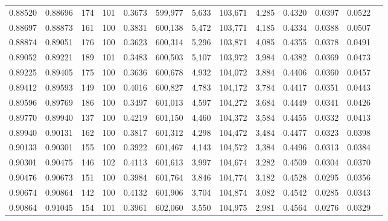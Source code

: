 \begin{tabular}{rrrrrrrrrrrrr}
0.88520 & 0.88696 &   174 & 101 &                                     0.3673 & 599,977 &   5,633 & 103,671 &   4,285 & 0.4320 & 0.0397 & 0.0522 \\
0.88697 & 0.88873 &   161 & 100 &                                     0.3831 & 600,138 &   5,472 & 103,771 &   4,185 & 0.4334 & 0.0388 & 0.0507 \\
0.88874 & 0.89051 &   176 & 100 &                                     0.3623 & 600,314 &   5,296 & 103,871 &   4,085 & 0.4355 & 0.0378 & 0.0491 \\
0.89052 & 0.89221 &   189 & 101 &                                     0.3483 & 600,503 &   5,107 & 103,972 &   3,984 & 0.4382 & 0.0369 & 0.0473 \\
0.89225 & 0.89405 &   175 & 100 &                                     0.3636 & 600,678 &   4,932 & 104,072 &   3,884 & 0.4406 & 0.0360 & 0.0457 \\
0.89412 & 0.89593 &   149 & 100 &                                     0.4016 & 600,827 &   4,783 & 104,172 &   3,784 & 0.4417 & 0.0351 & 0.0443 \\
0.89596 & 0.89769 &   186 & 100 &                                     0.3497 & 601,013 &   4,597 & 104,272 &   3,684 & 0.4449 & 0.0341 & 0.0426 \\
0.89770 & 0.89940 &   137 & 100 &                                     0.4219 & 601,150 &   4,460 & 104,372 &   3,584 & 0.4455 & 0.0332 & 0.0413 \\
0.89940 & 0.90131 &   162 & 100 &                                     0.3817 & 601,312 &   4,298 & 104,472 &   3,484 & 0.4477 & 0.0323 & 0.0398 \\
0.90133 & 0.90301 &   155 & 100 &                                     0.3922 & 601,467 &   4,143 & 104,572 &   3,384 & 0.4496 & 0.0313 & 0.0384 \\
0.90301 & 0.90475 &   146 & 102 &                                     0.4113 & 601,613 &   3,997 & 104,674 &   3,282 & 0.4509 & 0.0304 & 0.0370 \\
0.90476 & 0.90673 &   151 & 100 &                                     0.3984 & 601,764 &   3,846 & 104,774 &   3,182 & 0.4528 & 0.0295 & 0.0356 \\
0.90674 & 0.90864 &   142 & 100 &                                     0.4132 & 601,906 &   3,704 & 104,874 &   3,082 & 0.4542 & 0.0285 & 0.0343 \\
0.90864 & 0.91045 &   154 & 101 &                                     0.3961 & 602,060 &   3,550 & 104,975 &   2,981 & 0.4564 & 0.0276 & 0.0329 \\

\end{tabular}

